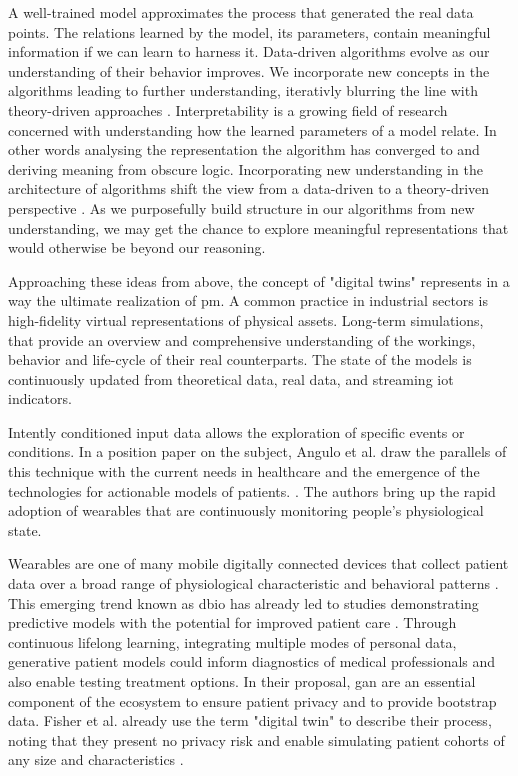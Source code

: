             A well-trained model approximates the process that generated the real data points. The relations learned by the model, its parameters, contain meaningful information if we can learn to harness it. Data-driven algorithms evolve as our understanding of their behavior improves. We incorporate new concepts in the algorithms leading to further understanding, iterativly blurring the line with theory-driven approaches \cite{Hand2019}. Interpretability is a growing field of research concerned with understanding how the learned parameters of a model relate. In other words analysing the representation the algorithm has converged to and deriving meaning from obscure logic. Incorporating new understanding in the architecture of algorithms shift the view from a data-driven to a theory-driven perspective \cite{Hand2019}. As we purposefully build structure in our algorithms from new understanding, we may get the chance to explore meaningful representations that would otherwise be beyond our reasoning.\par 
            
            Approaching these ideas from above, the concept of "digital twins" represents in a way the ultimate realization of \gls{pm}. A common practice in industrial sectors is high-fidelity virtual representations of physical assets. Long-term simulations, that provide an overview and comprehensive understanding of the workings, behavior and life-cycle of their real counterparts. The state of the models is continuously updated from theoretical data, real data, and streaming \gls{iot} indicators.\par
            Intently conditioned input data allows the exploration of specific events or conditions. In a position paper on the subject, Angulo et al. draw the parallels of this technique with the current needs in healthcare and the emergence of the technologies for actionable models of patients. \cite{angulo2019towards,Angulo_2020}. The authors bring up the rapid adoption of wearables that are continuously monitoring people's physiological state.\par 
            
            Wearables are one of many mobile digitally connected devices that collect patient data over a broad range of physiological characteristic and behavioral patterns \cite{coravos2019developing}. This emerging trend known as \gls{dbio} has already led to studies demonstrating predictive models with the potential for improved patient care \cite{snyder2018best}. Through continuous lifelong learning, integrating  multiple modes of personal data, generative patient models could inform diagnostics of medical professionals and also enable testing treatment options. In their proposal, \gls{gan} are an essential component of the ecosystem to ensure patient privacy and to provide bootstrap data. Fisher et al. already use the term "digital twin" to describe their process, noting that they present no privacy risk and enable simulating patient cohorts of any size and characteristics \cite{walsh2020generating}.
        
